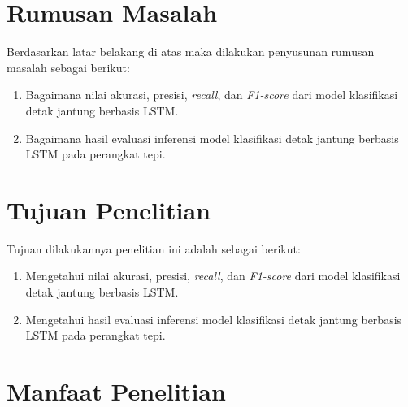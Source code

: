 \section{Rumusan Masalah}

Berdasarkan latar belakang di atas maka dilakukan penyusunan rumusan masalah sebagai berikut:

\begin{enumerate}
  \item Bagaimana nilai akurasi, presisi, \emph{recall}, dan \emph{F1-score} dari model klasifikasi detak jantung berbasis LSTM.
  \item Bagaimana hasil evaluasi inferensi model klasifikasi detak jantung berbasis LSTM pada perangkat tepi.
\end{enumerate}


\section{Tujuan Penelitian}
Tujuan dilakukannya penelitian ini adalah sebagai berikut:

\begin{enumerate}
  \item Mengetahui nilai akurasi, presisi, \emph{recall}, dan \emph{F1-score} dari model klasifikasi detak jantung berbasis LSTM.
  \item Mengetahui hasil evaluasi inferensi model klasifikasi detak jantung berbasis LSTM pada perangkat tepi.
\end{enumerate}


\section{Manfaat Penelitian}

